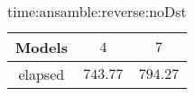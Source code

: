 \begin{table}[!ht]
	\centering
	\begin{tabular}{|c|c|c|}
		\hline
		Models & $4$ & $7$ \\ \hline
		elapsed & $743.77$ & $794.27$ \\ \hline
	\end{tabular}
	\caption{time:ansamble:reverse:noDst}
	\label{tab:time:ansamble:reverse:noDst}
\end{table}
